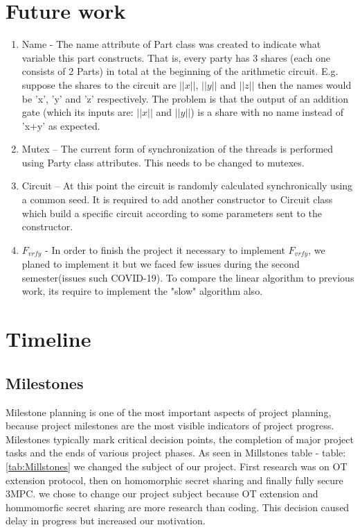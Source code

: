 \documentclass[12pt]{article}
\begin{document}
\section{Future work}

\begin{enumerate}
	\item Name - The name attribute of Part class was created to indicate what variable this part constructs. That is, every party has 3 shares (each one consists of 2 Parts) in total at the beginning of the arithmetic circuit. E.g. suppose the shares to the circuit are $||x||$, $||y||$ and $||z||$ then the names would be 'x', 'y' and 'z' respectively. The problem is that the output of an addition gate (which its inputs are: $||x||$ and $||y||$) is a share with no name instead of 'x+y' as expected.
	\item Mutex – The current form of synchronization of the threads is performed using Party class attributes. This needs to be changed to mutexes.
	\item Circuit – At this point the circuit is randomly calculated synchronically using a common seed. It is required to add another constructor to Circuit class which build a specific circuit according to some parameters sent to the constructor.
	\item $F_{vrfy}$ - In order to finish the project it necessary to implement $F_{vrfy}$, we planed to implement it but we faced few issues during the second semester(issues such COVID-19). To compare the linear algorithm to previous work, its require to implement the "slow" algorithm also. 
\end{enumerate}
\pagebreak
\section{Timeline}


\subsection{Milestones}
Milestone planning is one of the most important aspects of project planning, because project milestones are the most visible indicators of project progress. Milestones typically mark critical decision points, the completion of major project tasks and the ends of various project phases. 
\hfill\break
As seen in Millstones table - table: \ref{tab:Millstones} we changed the subject of our project. First research was on OT extension protocol, then on homomorphic secret sharing and finally fully secure 3MPC. we chose to change our project subject because OT extension and hommomorfic secret sharing are more research than coding. This decision caused delay in progress but increased our motivation.
\end{document}
